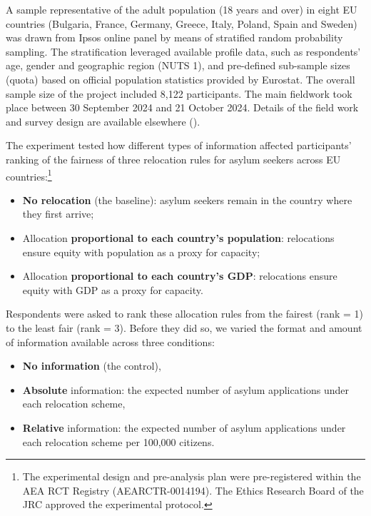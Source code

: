 \documentclass[
  12pt,
  a4paper,
]{article}
\providecommand{\tightlist}{%
  \setlength{\itemsep}{0pt}\setlength{\parskip}{0pt}}
\begin{document}
A sample representative of the adult population (18 years and over) in eight EU countries (Bulgaria, France, Germany, Greece, Italy, Poland, Spain and Sweden) was drawn from Ipsos online panel by means of stratified random probability sampling. The stratification leveraged available profile data, such as respondents' age, gender and geographic region (NUTS 1), and pre-defined sub-sample sizes (quota) based on official population statistics provided by Eurostat. The overall sample size of the project included 8,122 participants. The main fieldwork took place between 30 September 2024 and 21 October 2024. Details of the field work and survey design are available elsewhere ().

The experiment tested how different types of information affected participants' ranking of the fairness of three relocation rules for asylum seekers across EU countries:\footnote{
  The experimental design and pre-analysis plan were pre-registered within the AEA RCT Registry (AEARCTR-0014194). The Ethics Research Board of the JRC approved the experimental protocol.}

\begin{itemize}
\item
  \textbf{No relocation} (the baseline): asylum seekers remain in the country where they first arrive;
\item
  Allocation \textbf{proportional to each country's population}: relocations ensure equity with population as a proxy for capacity;
\item
  Allocation \textbf{proportional to each country's GDP}: relocations ensure equity with GDP as a proxy for capacity.
\end{itemize}

Respondents were asked to rank these allocation rules from the fairest (rank = 1) to the least fair (rank = 3). Before they did so, we varied the format and amount of information available across three conditions:

\begin{itemize}
\tightlist
\item
  \textbf{No information} (the control),
\item
  \textbf{Absolute} information: the expected number of asylum applications under each relocation scheme,
\item
  \textbf{Relative} information: the expected number of asylum applications under each relocation scheme per 100,000 citizens.
\end{itemize}
\end{document}
